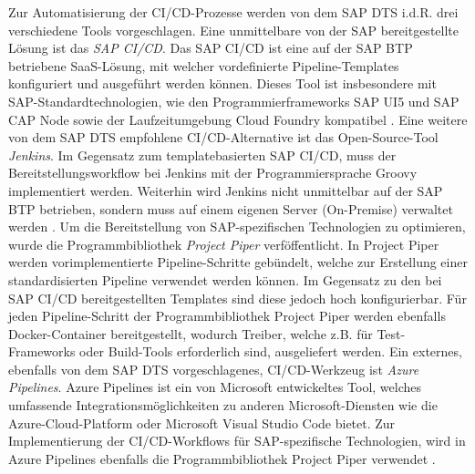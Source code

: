 Zur Automatisierung der CI/CD-Prozesse werden von dem SAP DTS i.d.R. drei verschiedene Tools vorgeschlagen. Eine unmittelbare von der SAP bereitgestellte Lösung ist das \textit{\ac{SAP CI/CD}}. Das SAP CI/CD ist eine auf der SAP BTP betriebene SaaS-Lösung, mit welcher vordefinierte Pipeline-Templates konfiguriert und ausgeführt werden können. Dieses Tool ist insbesondere mit SAP-Standardtechnologien, wie den Programmierframeworks SAP UI5 und SAP CAP Node sowie der Laufzeitumgebung Cloud Foundry kompatibel \cite{.20230405}. Eine weitere von dem SAP DTS empfohlene CI/CD-Alternative ist das Open-Source-Tool \textit{Jenkins}. Im Gegensatz zum templatebasierten SAP CI/CD, muss der Bereitstellungsworkflow bei Jenkins mit der Programmiersprache Groovy implementiert werden. Weiterhin wird Jenkins nicht unmittelbar auf der SAP BTP betrieben, sondern muss auf einem eigenen Server (On-Premise) verwaltet werden \cite[266]{Belmont.2018}. Um die Bereitstellung von SAP-spezifischen Technologien zu optimieren, wurde die Programmbibliothek \textit{Project Piper} verföffentlicht. In Project Piper werden vorimplementierte Pipeline-Schritte gebündelt, welche zur Erstellung einer standardisierten Pipeline verwendet werden können. Im Gegensatz zu den bei SAP CI/CD bereitgestellten Templates sind diese jedoch hoch konfigurierbar. Für jeden Pipeline-Schritt der Programmbibliothek Project Piper werden ebenfalls Docker-Container bereitgestellt, wodurch Treiber, welche z.B. für Test-Frameworks oder Build-Tools erforderlich sind, ausgeliefert werden.
Ein externes, ebenfalls von dem SAP DTS vorgeschlagenes, CI/CD-Werkzeug ist \textit{Azure Pipelines}. Azure Pipelines ist ein von Microsoft entwickeltes Tool, welches umfassende Integrationsmöglichkeiten zu anderen Microsoft-Diensten wie die Azure-Cloud-Platform oder Microsoft Visual Studio Code bietet. Zur Implementierung der CI/CD-Workflows für SAP-spezifische Technologien, wird in Azure Pipelines ebenfalls die Programmbibliothek Project Piper verwendet \cite{Naveen.20230224}.
